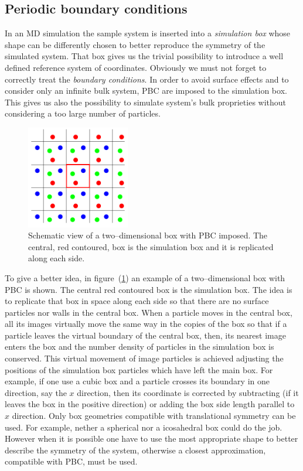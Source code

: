 \subsection{Periodic boundary conditions}
In an \ac{MD} simulation the sample system is inserted into a \textit{simulation box} whose shape can be
differently chosen to better reproduce the symmetry of the simulated system. That box gives us the trivial
possibility to introduce a well defined reference system of coordinates. Obviously we must not forget to
correctly treat the \textit{boundary conditions}. In order to avoid surface effects and to consider only an
infinite bulk system, \ac{PBC} are imposed to the simulation box. This gives us also the possibility to simulate
system's bulk proprieties without considering a too large number of particles.
\begin{figure}
	\includegraphics[width=0.4\textwidth]{./img/PBCScheme/PBCScheme}
	\caption{Schematic view of a two--dimensional box with \acs{PBC} imposed. The central, red contoured, box is the simulation box and it is replicated along each side.}
	\label{fig:pbc}
\end{figure}
To give a better idea, in figure~(\ref{fig:pbc}) an example of a two--dimensional box with \ac{PBC} is shown. The
central red contoured box is the simulation box. The idea is to replicate that box in space along each side so
that there are no surface particles nor walls in the central box. When a particle moves in the central box, all
its images virtually move the same way in the copies of the box so that if a particle leaves the virtual boundary
of the central box, then, its nearest image enters the box and the number density of particles in the simulation
box is conserved. This virtual movement of image particles is achieved adjusting the positions of the simulation
box particles which have left the main box. For example, if one use a cubic box and a particle crosses its
boundary in one direction, say the $x$ direction, then its coordinate is corrected by subtracting (if it leaves
the box in the positive direction) or adding the box side length parallel to $x$ direction. Only box geometries
compatible with translational symmetry can be used. For example, nether a spherical nor a icosahedral box could
do the job. However when it is possible one have to use the most appropriate shape to better describe the
symmetry of the system, otherwise a closest approximation, compatible with \ac{PBC}, must be used.

